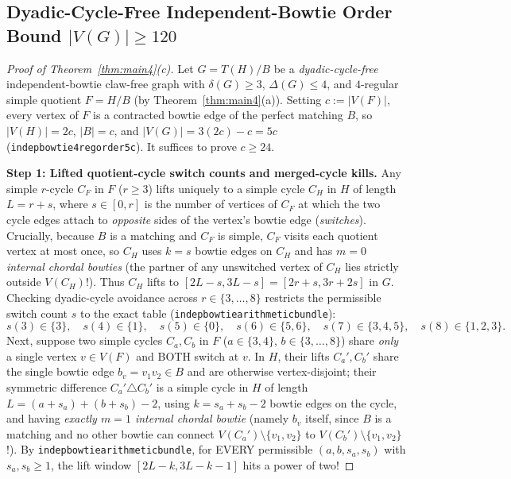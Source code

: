 \documentclass[11pt,reqno]{amsart}
\theoremstyle{plain}
\theoremstyle{definition}
\theoremstyle{remark}
\DeclareRobustCommand{\_}{\ifmmode\text{\textunderscore}\else\textunderscore\allowbreak\fi}
\begin{document}
\subsection{Dyadic-Cycle-Free Independent-Bowtie Order Bound \texorpdfstring{$|V(G)| \ge 120$}{|V(G)| >= 120}}\label{subsec:order120}

\begin{proof}[Proof of Theorem~\ref{thm:main4}(c)]
Let $G = T(H)/B$ be a \emph{dyadic-cycle-free} independent-bowtie claw-free graph with $\delta(G) \ge 3$, $\Delta(G) \le 4$, and $4$-regular simple quotient $F = H/B$ (by Theorem~\ref{thm:main4}(a)). Setting $c := |V(F)|$, every vertex of $F$ is a contracted bowtie edge of the perfect matching $B$, so $|V(H)| = 2c$, $|B| = c$, and $|V(G)| = 3(2c) - c = 5c$ (\texttt{indep\_bowtie\_4reg\_order\_5c}). It suffices to prove $c \ge 24$.

\medskip
\noindent\textbf{Step 1: Lifted quotient-cycle switch counts and merged-cycle kills.}
Any simple $r$-cycle $C_F$ in $F$ ($r \ge 3$) lifts uniquely to a simple cycle $C_H$ in $H$ of length $L = r + s$, where $s \in [0, r]$ is the number of vertices of $C_F$ at which the two cycle edges attach to \emph{opposite} sides of the vertex's bowtie edge (\emph{switches}). Crucially, because $B$ is a matching and $C_F$ is simple, $C_F$ visits each quotient vertex at most once, so $C_H$ uses $k = s$ bowtie edges on $C_H$ and has \emph{$m = 0$ internal chordal bowties} (the partner of any unswitched vertex of $C_H$ lies strictly outside $V(C_H)$!). Thus $C_H$ lifts to $[2L - s, 3L - s] = [2r + s, 3r + 2s]$ in $G$. Checking dyadic-cycle avoidance across $r \in \{3, \dots, 8\}$ restricts the permissible switch count $s$ to the exact table (\texttt{indep\_bowtie\_120\_arithmetic\_bundle}):
\[
  s(3) \in \{3\},\quad s(4) \in \{1\},\quad s(5) \in \{0\},\quad s(6) \in \{5, 6\},\quad s(7) \in \{3, 4, 5\},\quad s(8) \in \{1, 2, 3\}.
\]
Next, suppose two simple cycles $C_a, C_b$ in $F$ ($a \in \{3, 4\}$, $b \in \{3, \dots, 8\}$) share \emph{only} a single vertex $v \in V(F)$ and BOTH switch at $v$. In $H$, their lifts $C_a', C_b'$ share the single bowtie edge $b_v = v_1 v_2 \in B$ and are otherwise vertex-disjoint; their symmetric difference $C_a' \triangle C_b'$ is a simple cycle in $H$ of length $L = (a + s_a) + (b + s_b) - 2$, using $k = s_a + s_b - 2$ bowtie edges on the cycle, and having \emph{exactly $m = 1$ internal chordal bowtie} (namely $b_v$ itself, since $B$ is a matching and no other bowtie can connect $V(C_a') \setminus \{v_1, v_2\}$ to $V(C_b') \setminus \{v_1, v_2\}$!). By \texttt{indep\_bowtie\_120\_arithmetic\_bundle}, for EVERY permissible $(a, b, s_a, s_b)$ with $s_a, s_b \ge 1$, the lift window $[2L - k, 3L - k - 1]$ hits a power of two!


\end{proof}
\end{document}
